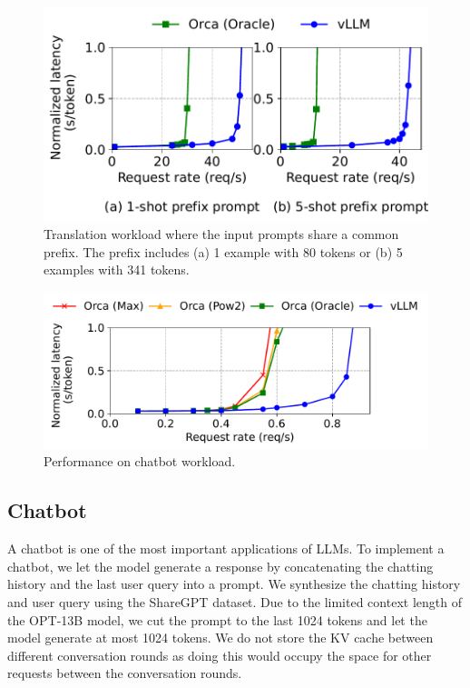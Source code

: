 \begin{figure}[t]
    \centering
    \includegraphics[width=.9\columnwidth]{figures/experiments/prefix.pdf}
    \vspace{-5pt}
    \caption{Translation workload where the input prompts share a common prefix. The prefix includes (a) 1 example with 80 tokens or (b) 5 examples with 341 tokens.}
\label{fig:prefix-share-exp}
\end{figure}

\begin{figure}
    \centering
    \includegraphics[width=0.8\columnwidth]{figures/experiments/chat-sharegpt.pdf}
    \vspace{-7pt}
    \caption{Performance on chatbot workload.}
    \label{fig:chatbot}
\end{figure}

\subsection{Chatbot}
\label{sec:chatbot}
A chatbot \cite{chatgpt, bard, vicuna2023} is one of the most important applications of LLMs.
To implement a chatbot, we let the model generate a response by concatenating the chatting history and the last user query into a prompt.
We synthesize the chatting history and user query using the ShareGPT dataset.
Due to the limited context length of the OPT-13B model, we cut the prompt to the last 1024 tokens and let the model generate at most 1024 tokens.
We do not store the KV cache between different conversation rounds as doing this would occupy the space for other requests between the conversation rounds.

